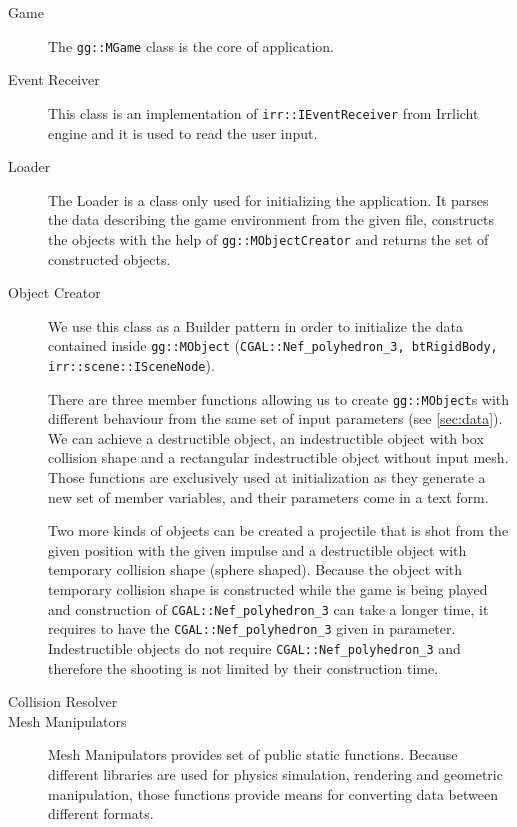 \begin{description}
\item[Game]
The {\tt gg::MGame} class is the core of application. 

\item[Event Receiver]
This class is an implementation of {\tt irr::IEventReceiver} from Irrlicht engine and it is used to read the user input.

\item[Loader]
The Loader is a class only used for initializing the application. It parses the data describing the game environment from the given file, constructs the objects with the help of {\tt gg::MObjectCreator} and returns the set of constructed objects.

\item[Object Creator]
We use this class as a Builder pattern in order to initialize the data contained inside {\tt gg::MObject} ({\tt CGAL::Nef\_polyhedron\_3, btRigidBody, irr::scene::ISceneNode}).

There are three member functions allowing us to create {\tt gg::MObject}s  with different behaviour from the same set of input parameters (see \cref{sec:data}). We can achieve a destructible object, an indestructible object with box collision shape and a rectangular indestructible object without input mesh. Those functions are exclusively used at initialization as they generate a new set of member variables, and their parameters come in a text form.

Two more kinds of objects can be created a projectile that is shot from the given position with the given impulse and a destructible object with temporary collision shape (sphere shaped). Because the object with temporary collision shape is constructed while the game is being played and construction of {\tt CGAL::Nef\_polyhedron\_3} can take a longer time, it requires to have the {\tt CGAL::Nef\_polyhedron\_3} given in parameter. Indestructible objects do not require {\tt CGAL::Nef\_polyhedron\_3}  and therefore the shooting is not limited by their construction time.

\item[Collision Resolver]

\item[Mesh Manipulators]
Mesh Manipulators provides set of public static functions. Because different libraries are used for physics simulation, rendering and geometric manipulation, those functions provide means for converting data between different formats.
\end{description}




